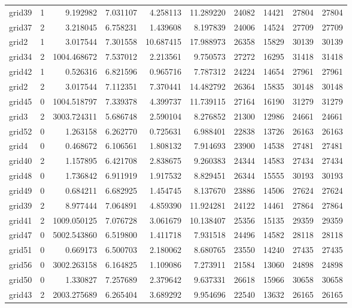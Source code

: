 \begin{longtable}{|l|r|r|r|r|r|r|r|r|r|}
grid39 & 1 & 9.192982 & 7.031107 & 4.258113 & 11.289220 & 24082 & 14421 & 27804 & 27804 \\
grid37 & 2 & 3.218045 & 6.758231 & 1.439608 & 8.197839 & 24006 & 14524 & 27709 & 27709 \\
grid2 & 1 & 3.017544 & 7.301558 & 10.687415 & 17.988973 & 26358 & 15829 & 30139 & 30139 \\
grid34 & 2 & 1004.468672 & 7.537012 & 2.213561 & 9.750573 & 27272 & 16295 & 31418 & 31418 \\
grid42 & 1 & 0.526316 & 6.821596 & 0.965716 & 7.787312 & 24224 & 14654 & 27961 & 27961 \\
grid2 & 2 & 3.017544 & 7.112351 & 7.370441 & 14.482792 & 26364 & 15835 & 30148 & 30148 \\
grid45 & 0 & 1004.518797 & 7.339378 & 4.399737 & 11.739115 & 27164 & 16190 & 31279 & 31279 \\
grid3 & 2 & 3003.724311 & 5.686748 & 2.590104 & 8.276852 & 21300 & 12986 & 24661 & 24661 \\
grid52 & 0 & 1.263158 & 6.262770 & 0.725631 & 6.988401 & 22838 & 13726 & 26163 & 26163 \\
grid4 & 0 & 0.468672 & 6.106561 & 1.808132 & 7.914693 & 23900 & 14538 & 27481 & 27481 \\
grid40 & 2 & 1.157895 & 6.421708 & 2.838675 & 9.260383 & 24344 & 14583 & 27434 & 27434 \\
grid48 & 0 & 1.736842 & 6.911919 & 1.917532 & 8.829451 & 26344 & 15555 & 30193 & 30193 \\
grid49 & 0 & 0.684211 & 6.682925 & 1.454745 & 8.137670 & 23886 & 14506 & 27624 & 27624 \\
grid39 & 2 & 8.977444 & 7.064891 & 4.859390 & 11.924281 & 24122 & 14461 & 27864 & 27864 \\
grid41 & 2 & 1009.050125 & 7.076728 & 3.061679 & 10.138407 & 25356 & 15135 & 29359 & 29359 \\
grid47 & 0 & 5002.543860 & 6.519800 & 1.411718 & 7.931518 & 24496 & 14582 & 28118 & 28118 \\
grid51 & 0 & 0.669173 & 6.500703 & 2.180062 & 8.680765 & 23550 & 14240 & 27435 & 27435 \\
grid56 & 0 & 3002.263158 & 6.164825 & 1.109086 & 7.273911 & 21584 & 13060 & 24898 & 24898 \\
grid50 & 0 & 1.330827 & 7.257689 & 2.379642 & 9.637331 & 26618 & 15966 & 30658 & 30658 \\
grid43 & 2 & 2003.275689 & 6.265404 & 3.689292 & 9.954696 & 22540 & 13632 & 26165 & 26165 \\

\end{longtable}
